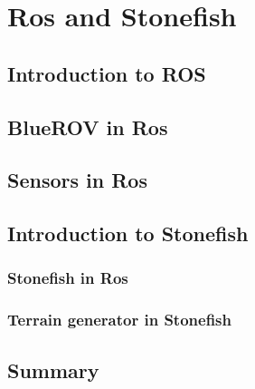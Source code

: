\chapter{Ros and Stonefish}
\label{chap:fifth}
\ifpdf
    \graphicspath{{Chapter5/Figures/PNG/}{Chapter5/Figures/PDF/}{Chapter5/Figures/}{Chapter5/Figures/EPS/}}
\else
    \graphicspath{{Chapter5/Figures/EPS/}{Chapter5/Figures/}}
\fi

\section{Introduction to ROS}

\section{BlueROV in Ros}

\section{Sensors in Ros}  

\section{Introduction to Stonefish}
\subsection{Stonefish in Ros}
\subsection{Terrain generator in Stonefish}

\section{Summary}